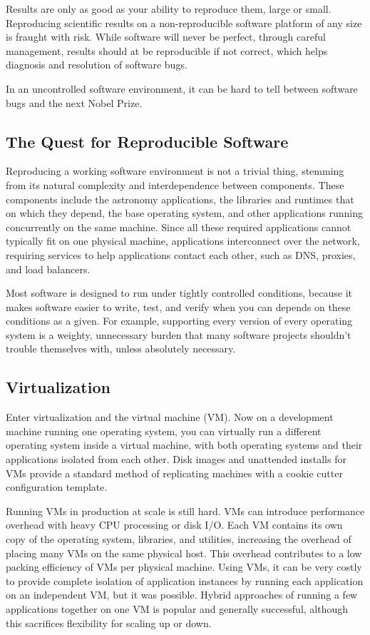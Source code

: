 \documentclass[11pt,twoside]{article}
\begin{document}
Results are only as good as your ability to reproduce them, large or small.
Reproducing scientific results on a non-reproducible software platform of any size
is fraught with risk.  While software will never be perfect, through careful
management, results should at be reproducible if not correct, which helps diagnosis
and resolution of software bugs.

In an uncontrolled software environment, it can be hard to tell between software bugs
and the next Nobel Prize.

\subsection{The Quest for Reproducible Software}

Reproducing a working software environment is not a trivial thing, stemming from
its natural complexity and interdependence between components.  These components
include the astronomy applications, the libraries and runtimes that
on which they depend, the base operating system, and other applications running 
concurrently on the same machine.  Since all these required applications cannot
typically fit on one physical machine, applications interconnect over the network,
requiring services to help applications contact each other, such as DNS, proxies,
and load balancers.

Most software is designed to run under tightly controlled conditions, because
it makes software easier to write, test, and verify when you can depends on these
conditions as a given.  For example, supporting every version of every
operating system is a weighty, unnecessary burden that many software projects
shouldn't trouble themselves with, unless absolutely necessary.

\subsection{Virtualization}

Enter virtualization and the virtual machine (VM).  Now on a development machine running
one operating system, you can virtually run a different operating system inside a virtual
machine, with both operating systems and their applications isolated from each other.
Disk images and unattended installs for VMs provide a standard method of replicating
machines with a cookie cutter configuration template.

Running VMs in production at scale is still hard.  VMs can introduce performance
overhead with heavy CPU processing or disk I/O.  Each VM contains its own copy of the operating
system, libraries, and utilities, increasing the overhead of placing many VMs on the same
physical host.  This overhead contributes to a low packing efficiency of VMs per physical machine.
Using VMs, it can be very costly to provide complete isolation of application
instances by running each application on an independent VM, but it was possible.
Hybrid approaches of running a few applications together on one VM is popular and generally
successful, although this sacrifices flexibility for scaling up or down.
\end{document}

